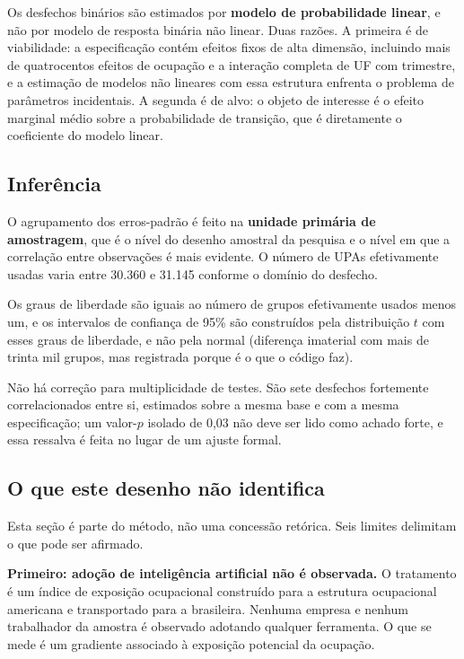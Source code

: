 Os desfechos binários são estimados por \textbf{modelo de probabilidade linear},
e não por modelo de resposta binária não linear. Duas razões. A primeira é de
viabilidade: a especificação contém efeitos fixos de alta dimensão, incluindo
mais de quatrocentos efeitos de ocupação e a interação completa de UF com
trimestre, e a estimação de modelos não lineares com essa estrutura enfrenta o
problema de parâmetros incidentais. A segunda é de alvo: o objeto de interesse é
o efeito marginal médio sobre a probabilidade de transição, que é diretamente o
coeficiente do modelo linear.

\subsection{Inferência}

O agrupamento dos erros-padrão é feito na \textbf{unidade primária de
amostragem}, que é o nível do desenho amostral da pesquisa e o nível em que a
correlação entre observações é mais evidente. O número de UPAs efetivamente
usadas varia entre 30.360 e 31.145 conforme o domínio do desfecho.

Os graus de liberdade são iguais ao número de grupos efetivamente usados menos
um, e os intervalos de confiança de 95\% são construídos pela distribuição $t$
com esses graus de liberdade, e não pela normal (diferença imaterial com
mais de trinta mil grupos, mas registrada porque é o que o código faz).

Não há correção para multiplicidade de testes. São sete desfechos fortemente
correlacionados entre si, estimados sobre a mesma base e com a mesma
especificação; um valor-$p$ isolado de 0,03 não deve ser lido como achado forte,
e essa ressalva é feita no lugar de um ajuste formal.

\subsection{O que este desenho não identifica}
\label{sec:limites}

Esta seção é parte do método, não uma concessão retórica. Seis limites
delimitam o que pode ser afirmado.

\textbf{Primeiro: adoção de inteligência artificial não é observada.} O
tratamento é um índice de exposição ocupacional construído para a estrutura
ocupacional americana e transportado para a brasileira. Nenhuma empresa e
nenhum trabalhador da amostra é observado adotando qualquer ferramenta. O que se
mede é um gradiente associado à exposição potencial da ocupação.

